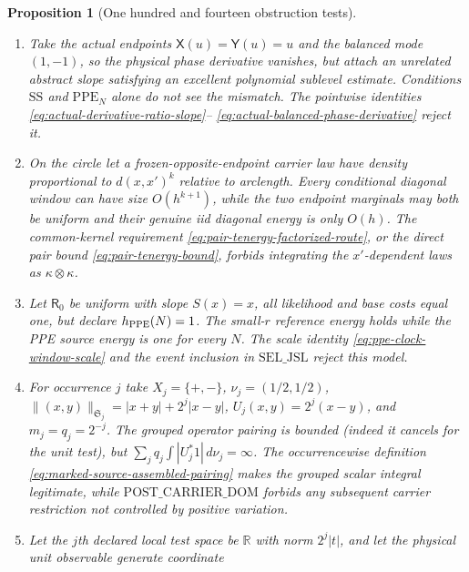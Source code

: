 \documentclass[11pt]{article}
\newtheorem{proposition}[theorem]{Proposition}
\begin{document}
\begin{proposition}[One hundred and fourteen obstruction tests]
\begin{enumerate}[label=\textup{(T\arabic*)}]
      continuous bump $\Phi_s$ supported in $(s,3s)$ with
      $\Phi_s(2s)=1$ but pointwise limit zero.  Uniform sup norm and
      branchwise pointwise convergence do not imply convergence of the
      pairing.  The common off-boundary BL modulus and convergence in
      \eqref{eq:moving-face-test-BL-convergence} reject this model.
\item Take the actual endpoints $\mathsf X(u)=\mathsf Y(u)=u$ and the
      balanced mode $(1,-1)$, so the physical phase derivative vanishes,
      but attach an unrelated abstract slope satisfying an excellent
      polynomial sublevel estimate.  Conditions $\mathrm{SS}$ and
      $\mathrm{PPE}_{N}$ alone do not see the mismatch.  The pointwise
      identities \eqref{eq:actual-derivative-ratio-slope}--
      \eqref{eq:actual-balanced-phase-derivative} reject it.
\item On the circle let a frozen-opposite-endpoint carrier law have density
      proportional to $d(x,x')^k$ relative to arclength.  Every conditional
      diagonal window can have size $O(h^{k+1})$, while the two endpoint
      marginals may both be uniform and their genuine iid diagonal energy is
      only $O(h)$.  The common-kernel requirement
      \eqref{eq:pair-tenergy-factorized-route}, or the direct pair bound
      \eqref{eq:pair-tenergy-bound}, forbids integrating the
      $x'$-dependent laws as $\kappa\otimes\kappa$.
\item Let $\mathsf R_0$ be uniform with slope $S(x)=x$, all likelihood and
      base costs equal one, but declare $h_{\rm PPE}(N)=1$.  The small-$r$
      reference energy holds while the PPE source energy is one for every
      $N$.  The scale identity \eqref{eq:ppe-clock-window-scale} and the
      event inclusion in $\mathrm{SEL\_JSL}$ reject this model.
\item For occurrence $j$ take $X_j=\{+,-\}$,
      $\nu_j=(1/2,1/2)$,
      $\|(x,y)\|_{\mathfrak S_j}=|x+y|+2^j|x-y|$,
      $U_j(x,y)=2^j(x-y)$, and $m_j=q_j=2^{-j}$.  The grouped operator
      pairing is bounded (indeed it cancels for the unit test), but
      $\sum_jq_j\int|U_j^*1|\,d\nu_j=\infty$.  The occurrencewise definition
      \eqref{eq:marked-source-assembled-pairing} makes the grouped scalar
      integral legitimate, while $\mathrm{POST\_CARRIER\_DOM}$ forbids any
      subsequent carrier restriction not controlled by positive variation.
\item Let the $j$th declared local test space be $\mathbb R$ with norm
      $2^j|t|$, and let the physical unit observable generate coordinate

\end{enumerate}
\end{proposition}
\end{document}
